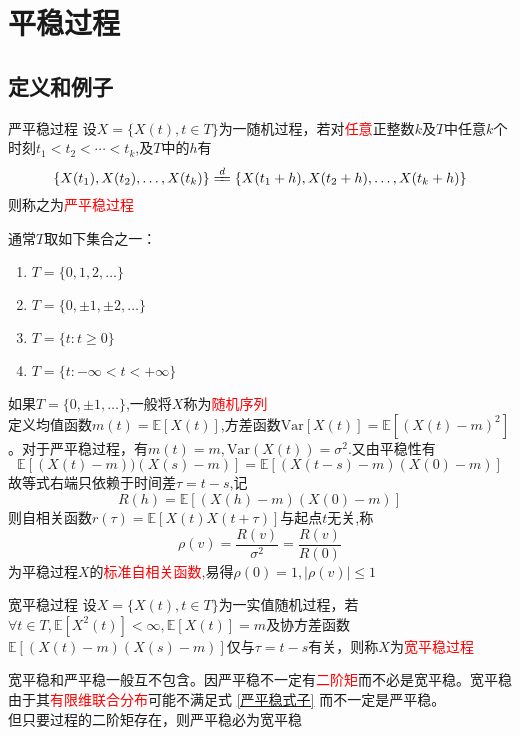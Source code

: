 \documentclass{elegantbook}
\newcommand\var{\text{Var}}
\newcommand\E{\mathbb{E}}
\begin{document}
\chapter{平稳过程}
\section{定义和例子}
\begin{definition}{严平稳过程}{}
    设$X=\{X(t),t\in T\}$为一随机过程，若对\textcolor{red}{任意}正整数$k$及$T$中任意$k$个时刻$t_1<t_2<\cdots <t_k$,及$T$中的$h$有
    \begin{equation}
        \{X(t_1),X(t_2),\dots ,X(t_k)\}\xlongequal{d}\{X(t_1+h),X(t_2+h),\dots ,X(t_k+h)\}\label{严平稳式子}
    \end{equation}
    则称之为\textcolor{red}{严平稳过程}
\end{definition}
\begin{remark}
    通常$T$取如下集合之一：
    \begin{enumerate}
        \item $T=\{0,1,2,\dots \}$
        \item $T=\{0,\pm 1,\pm 2,\dots \}$
        \item $T=\{t:t\geq 0\}$
        \item $T=\{t:-\infty <t<+\infty\}$
    \end{enumerate}
    如果$T=\{0,\pm 1,\dots \}$,一般将$X$称为\textcolor{red}{随机序列}
    \\ 定义均值函数$m(t)=\E[X(t)]$,方差函数$\var[X(t)]=\E[(X(t)-m)^2]$。对于严平稳过程，有$m(t)=m,\var(X(t))=\sigma ^2$.又由平稳性有
    \[\E[(X(t)-m))(X(s)-m)]=\E[(X(t-s)-m)(X(0)-m)]\]
    故等式右端只依赖于时间差$\tau=t-s$,记\[R(h)=\E[(X(h)-m)(X(0)-m)]\]
    则自相关函数$r(\tau)=\E[X(t)X(t+\tau)]$与起点$t$无关,称\[\rho(v)=\frac{R(v)}{\sigma ^2}=\frac{R(v)}{R(0)}\]为平稳过程$X$的\textcolor{red}{标准自相关函数},易得$\rho(0)=1,|\rho(v)|\leq 1$
\end{remark}

\begin{definition}{宽平稳过程}{}
    设$X=\{X(t),t\in T\}$为一实值随机过程，若$\forall t\in T,\E[X^2(t)]<\infty,\E[X(t)]=m$及协方差函数$\E[(X(t)-m)(X(s)-m)]$仅与$\tau=t-s$有关，则称$X$为\textcolor{red}{宽平稳过程}
\end{definition}
\begin{note}
    宽平稳和严平稳一般互不包含。因严平稳不一定有\textcolor{red}{二阶矩}而不必是宽平稳。宽平稳由于其\textcolor{red}{有限维联合分布}可能不满足式 \ref{严平稳式子} 而不一定是严平稳。
    \\ 但只要过程的二阶矩存在，则严平稳必为宽平稳
\end{note}
\end{document}
